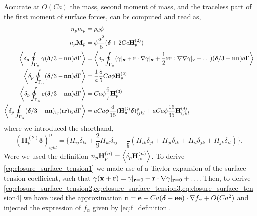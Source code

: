  
Accurate at $O(Ca)$ the mass, second moment of mass, and the traceless part of the first moment of surface forces, can be computed and read as, 
\begin{align}
    n_p m_p &= \rho_d \phi   
    \label{eq:volume}
    \\ 
    \label{eq:second_moment_of_mass}
    n_p \textbf{M}_p &= \phi \frac{a^2}{5}(\bm\delta+2Ca \textbf{H}_p^{(2)}) \\
    \label{eq:closure_surface_tension1}
    \pSavg{\gamma (\bm\delta/3 - \textbf{nn})} &=
      \pSavg{(\gamma|_\textbf{x}+\textbf{r}\cdot \grad \gamma|_\textbf{x}+\frac{1}{2}\textbf{rr}:\grad\grad\gamma|_\textbf{x}+\ldots) (\bm\delta/3 - \textbf{nn})} \\
    \label{eq:closure_surface_tension2}
    \pSavg{ (\bm\delta/3 - \textbf{nn})}  
    &=
    \frac{1}{a}\frac{8}{5} Ca \phi \textbf{H}_p^{(2)}\\
    \pSavg{\textbf{r} (\bm\delta/3 - \textbf{nn})}  
    &= Ca  \phi  \frac{6}{7}  \textbf{H}^{(3)}_p
    \label{eq:closure_surface_tension3}\\
    \pSavg{ (\bm\delta/3 - \textbf{nn})_{ij}(\textbf{rr})_{kl}}  
    &= a Ca \phi \frac{4}{15} 
    (\textbf{H}_p^{(2)}\bm\delta)^\text{p}_{ijkl}
    +
    a Ca \phi \frac{16}{35} \textbf{H}^{(4)}_{ijkl} 
    \label{eq:closure_surface_tension4}
\end{align}
where we introduced the shorthand, 
\begin{equation}
    (\textbf{H}_p^{(2)}\bm\delta)^\text{p}_{ijkl}
    =  \{
        H_{ij}\delta_{kl}
        + \frac{2}{9} H_{kl}\delta_{ij}
        - \frac{1}{6} (H_{ik}\delta_{jl}+ H_{jl}\delta_{ik}+H_{il}\delta_{jk}+H_{jk}\delta_{il})
        \}.
\end{equation}
Were we used the definition $n_p \textbf{H}_p^{(n)} = \left<\delta_{p} \textbf{H}_\alpha^{(n)}\right>$. 
To derive \ref{eq:closure_surface_tension1} we made use of a Taylor expansion of the surface tension coefficient, such that $\gamma(\textbf{x}+ \textbf{r}) = \gamma|_{\textbf{r}=0}+ \textbf{r}\cdot \mathbf{\nabla}\gamma|_{\textbf{r}=0}+ \ldots$. 
Then, to derive \ref{eq:closure_surface_tension2,eq:closure_surface_tension3,eq:closure_surface_tension4} we have used the approximation $\textbf{n} = \textbf{e} - Ca (\bm\delta - \textbf{e}\textbf{e})\cdot \mathbf{\nabla} f_\alpha + O(Ca^2)$ and injected the expression of $f_\alpha$ given by \ref{eq:f_definition}.  


